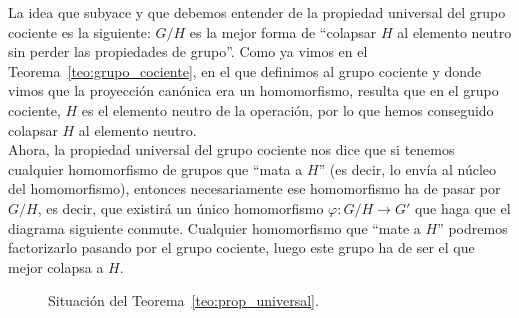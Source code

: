 \noindent
La idea que subyace y que debemos entender de la propiedad universal del grupo cociente es la siguiente: $G/H$ es la mejor forma de ``colapsar $H$ al elemento neutro sin perder las propiedades de grupo''. Como ya vimos en el Teorema~\ref{teo:grupo_cociente}, en el que definimos al grupo cociente y donde vimos que la proyección canónica era un homomorfismo, resulta que en el grupo cociente, $H$ es el elemento neutro de la operación, por lo que hemos conseguido colapsar $H$ al elemento neutro.\\

Ahora, la propiedad universal del grupo cociente nos dice que si tenemos cualquier homomorfismo de grupos que ``mata a $H$'' (es decir, lo envía al núcleo del homomorfismo), entonces necesariamente ese homomorfismo ha de pasar por $G/H$, es decir, que existirá un único homomorfismo $\varphi:G/H\to G'$ que haga que el diagrama siguiente conmute. Cualquier homomorfismo que ``mate a $H$'' podremos factorizarlo pasando por el grupo cociente, luego este grupo ha de ser el que mejor colapsa a $H$.

\begin{figure}[H]
    \centering
    \caption{Situación del Teorema~\ref{teo:prop_universal}.}
    \label{fig:teo_propiedad_universal}
\end{figure}

